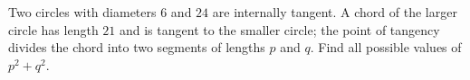 Two circles with diameters $6$ and $24$ are internally tangent. A chord of the larger circle has length $21$ and is tangent to the smaller circle; the point of tangency divides the chord into two segments of lengths $p$ and $q$. Find all possible values of $p^2+q^2$.
